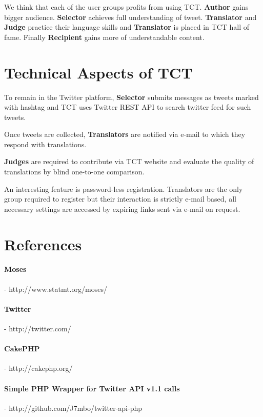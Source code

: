 \documentclass[11pt]{article}
\begin{document}
We think that each of the user groups profits from using TCT. 
\textbf{Author} gains bigger audience. 
\textbf{Selector} achieves full understanding of tweet.
\textbf{Translator} and \textbf{Judge} practice their language skills 
and \textbf{Translator} is placed in TCT hall of fame.
Finally \textbf{Recipient} gains more of understandable content.

\section{Technical Aspects of TCT}
\label{implementation}
To remain in the Twitter platform,
\textbf{Selector} submits messages as tweets marked with hashtag 
 and TCT uses Twitter REST API to search twitter feed
for such tweets.

Once tweets are collected, \textbf{Translators} are notified via e-mail
to which they respond with translations. %

\textbf{Judges} are %
required to contribute via 
TCT website and evaluate the quality of translations by blind one-to-one 
comparison. 

An interesting feature is password-less registration. 
Translators are the only group required to register but their interaction
is strictly e-mail based, all necessary settings are accessed by expiring links sent via e-mail on request. 

\section*{References}

% 
%  

\paragraph{Moses} - http://www.statmt.org/moses/
\paragraph{Twitter} - http://twitter.com/
\paragraph{CakePHP} - http://cakephp.org/
\paragraph{Simple PHP Wrapper for Twitter API v1.1 calls} - http://github.com/J7mbo/twitter-api-php
\end{document}
